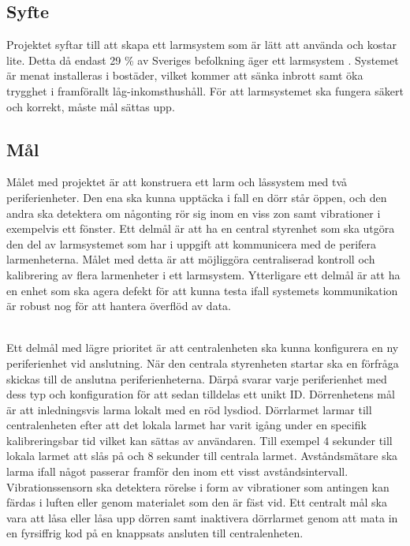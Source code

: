\documentclass{article}
\begin{document}

\subsection{Syfte}
Projektet syftar till att skapa ett larmsystem som är lätt att använda och kostar lite.
Detta då endast 29 \% av Sveriges befolkning äger ett larmsystem \cite{SSF}.
Systemet är menat installeras i bostäder, vilket kommer att sänka inbrott samt öka trygghet i framförallt låg-inkomsthushåll.
För att larmsystemet ska fungera säkert och korrekt, måste mål sättas upp. 


\subsection{Mål}
Målet med projektet är att konstruera ett larm och låssystem med två periferienheter.
Den ena ska kunna upptäcka i fall en dörr står öppen, och den andra ska detektera om någonting rör sig inom en viss zon samt vibrationer i exempelvis ett fönster. 
Ett delmål är att ha en central styrenhet som ska utgöra den del av larmsystemet som har i uppgift att kommunicera med de perifera larmenheterna.
Målet med detta är att möjliggöra centraliserad kontroll och kalibrering av flera larmenheter i ett larmsystem.
Ytterligare ett delmål är att ha en enhet som ska agera defekt för att kunna testa ifall systemets kommunikation är robust nog för att hantera överflöd av data.

\noindent
\\
Ett delmål med lägre prioritet är att centralenheten ska kunna konfigurera en ny periferienhet vid anslutning. När den centrala styrenheten startar ska en förfråga skickas till de anslutna periferienheterna. 
Därpå svarar varje periferienhet med dess typ och konfiguration för att sedan tilldelas ett unikt ID. 
Dörrenhetens mål är att inledningsvis larma lokalt med en röd lysdiod. 
Dörrlarmet larmar till centralenheten efter att det lokala larmet har varit igång under en specifik kalibreringsbar tid vilket kan sättas av användaren. Till exempel 4 sekunder till lokala larmet att slås på och 8 sekunder till centrala larmet.
Avståndsmätare ska larma ifall något passerar framför den inom ett visst avståndsintervall.
Vibrationssensorn ska detektera rörelse i form av vibrationer som antingen kan färdas i luften eller genom materialet som den är fäst vid. 
Ett centralt mål ska vara att låsa eller låsa upp dörren samt inaktivera dörrlarmet genom att mata in en fyrsiffrig kod på en knappsats ansluten till centralenheten.
\end{document}
